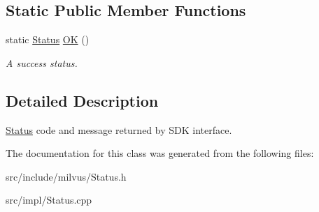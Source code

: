 \subsection*{Static Public Member Functions}
\begin{DoxyCompactItemize}
\item 
\mbox{\label{classmilvus_1_1_status_a931f620b689f89e6556a88a4ddb35356}} 
static \hyperlink{classmilvus_1_1_status}{Status} \hyperlink{classmilvus_1_1_status_a931f620b689f89e6556a88a4ddb35356}{OK} ()
\begin{DoxyCompactList}\small\item\em A success status. \end{DoxyCompactList}\end{DoxyCompactItemize}


\subsection{Detailed Description}
\hyperlink{classmilvus_1_1_status}{Status} code and message returned by S\+DK interface. 

The documentation for this class was generated from the following files\+:\begin{DoxyCompactItemize}
\item 
src/include/milvus/Status.\+h\item 
src/impl/Status.\+cpp\end{DoxyCompactItemize}
